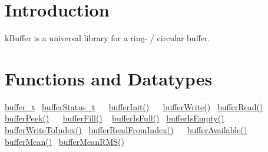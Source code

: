 \hypertarget{index_intro}{}\section{Introduction}\label{index_intro}
k\+Buffer is a universal library for a ring-\/ / circular buffer. \hypertarget{index_function}{}\section{Functions and Datatypes}\label{index_function}
\hyperlink{structbuffer__t}{buffer\+\_\+t}~\newline
 \hyperlink{k_buffer_8h_a7a0bf550b7bd49d85172e409c0034fe6}{buffer\+Status\+\_\+t}~\newline
 ~\newline
 \hyperlink{k_buffer_8c_aec18d6ea571b1326dbeb7ca15f4969c0}{buffer\+Init()}~\newline
 ~\newline
 \hyperlink{k_buffer_8c_a9d6410a89adf65a3ef12340ecb9bbd55}{buffer\+Write()}~\newline
 \hyperlink{k_buffer_8c_a9b80be9033ccd6b5a101f811520ab4cc}{buffer\+Read()}~\newline
 \hyperlink{k_buffer_8c_a5ecef1fd460ed9635269abce02be866f}{buffer\+Peek()}~\newline
 ~\newline
 \hyperlink{k_buffer_8c_ac806d926fd21729feb18f8e7738e76b4}{buffer\+Fill()} ~\newline
 \hyperlink{k_buffer_8c_ac69b8a12a33d0cf0a5dab8feb4f7b020}{buffer\+Is\+Full()}~\newline
 \hyperlink{k_buffer_8c_a5c599b9386c73ccd7b5eeb25f6cca38e}{buffer\+Is\+Empty()}~\newline
 ~\newline
 \hyperlink{k_buffer_8c_a8508583be1e356a243b0ce67254c516e}{buffer\+Write\+To\+Index()}~\newline
 \hyperlink{k_buffer_8c_aa0d7e2a4b6fd3da2822d7f968be74e5c}{buffer\+Read\+From\+Index()}~\newline
 ~\newline
 \hyperlink{k_buffer_8c_afa8bb2b701cd9b7f871c12e0fabd66e1}{buffer\+Available()}~\newline
 ~\newline
 \hyperlink{k_buffer_8c_a1389f5c08210e077301c35bc3b43f681}{buffer\+Mean()}~\newline
 \hyperlink{k_buffer_8c_a1da694b34c0a52809c923d2d149d1348}{buffer\+Mean\+R\+M\+S()}~\newline

